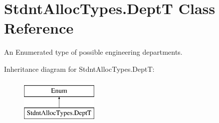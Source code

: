\hypertarget{class_stdnt_alloc_types_1_1_dept_t}{}\section{Stdnt\+Alloc\+Types.\+DeptT Class Reference}
\label{class_stdnt_alloc_types_1_1_dept_t}


An Enumerated type of possible engineering departments.  


Inheritance diagram for Stdnt\+Alloc\+Types.\+DeptT\+:\begin{figure}[H]
\begin{center}
\leavevmode
\includegraphics[height=2.000000cm]{class_stdnt_alloc_types_1_1_dept_t}
\end{center}
\end{figure}
